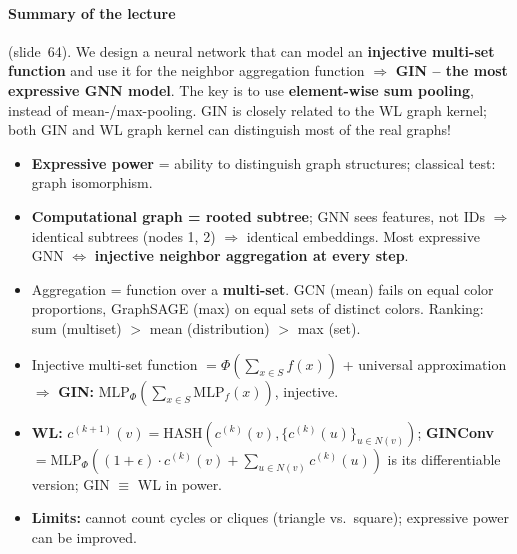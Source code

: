 \paragraph{Summary of the lecture} (slide~64). We design a neural network that
can model an \textbf{injective multi-set function} and use it for the neighbor
aggregation function $\Rightarrow$ \textbf{GIN -- the most expressive GNN model}.
The key is to use \textbf{element-wise sum pooling}, instead of mean-/max-pooling.
GIN is closely related to the WL graph kernel; both GIN and WL graph kernel can
distinguish most of the real graphs!

\bigskip{}
{}
\begin{summarybox}
  \begin{itemize}
    \item \textbf{Expressive power} = ability to distinguish graph structures;
      classical test: graph isomorphism.
    \item \textbf{Computational graph = rooted subtree}; GNN sees features, not
      IDs $\Rightarrow$ identical subtrees (nodes 1, 2) $\Rightarrow$ identical
      embeddings. Most expressive GNN $\Leftrightarrow$ \textbf{injective neighbor
      aggregation at every step}.
    \item Aggregation = function over a \textbf{multi-set}. GCN (mean) fails on
      equal color proportions, GraphSAGE (max) on equal sets of distinct colors.
      Ranking: sum (multiset) $>$ mean (distribution) $>$ max (set).
    \item Injective multi-set function $=\Phi(\sum_{x\in S}f(x))$ + universal
      approximation $\Rightarrow$ \textbf{GIN:}
      $\mathrm{MLP}_{\Phi}(\sum_{x\in S}\mathrm{MLP}_f(x))$, injective.
    \item \textbf{WL:} $c^{(k+1)}(v)=\mathrm{HASH}(c^{(k)}(v),
      \{c^{(k)}(u)\}_{u\in N(v)})$; \textbf{GINConv}
      $=\mathrm{MLP}_{\Phi}((1+\epsilon)\cdot c^{(k)}(v)+\sum_{u\in N(v)}c^{(k)}(u))$
      is its differentiable version; GIN $\equiv$ WL in power.
    \item \textbf{Limits:} cannot count cycles or cliques (triangle vs.\ square);
      expressive power can be improved.
  \end{itemize}
\end{summarybox}
